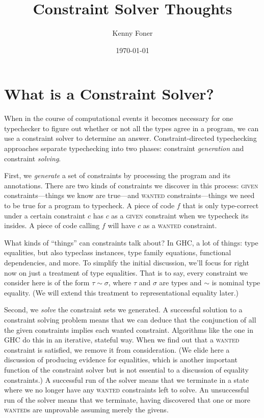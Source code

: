 \documentclass[10pt, letterpaper, oneside]{article}
\title{Constraint Solver Thoughts}
\author{Kenny Foner}
\date{\today}
\begin{document}
\maketitle

\section{What is a Constraint Solver?}

When in the course of computational events it becomes necessary for one typechecker to figure out whether or not all the types agree in a program, we can use a constraint solver to determine an answer. Constraint-directed typechecking approaches separate typechecking into two phases: constraint \emph{generation} and constraint \emph{solving}.

First, we \emph{generate} a set of constraints by processing the program and its annotations. There are two kinds of constraints we discover in this process: \textsc{given} constraints---things we know are true---and \textsc{wanted} constraints---things we need to be true for a program to typecheck. A piece of code \(f\) that is only type-correct under a certain constraint \(c\) has \(c\) as a \textsc{given} constraint when we typecheck its insides. A piece of code calling \(f\) will have \(c\) as a \textsc{wanted} constraint.

What kinds of ``things'' can constraints talk about? In GHC, a lot of things: type equalities, but also typeclass instances, type family equations, functional dependencies, and more. To simplify the initial discussion, we'll focus for right now on just a treatment of type equalities. That is to say, every constraint we consider here is of the form \(\tau \sim \sigma\), where \(\tau\) and \(\sigma\) are types and \(\sim\) is nominal type equality. (We will extend this treatment to representational equality later.)

Second, we \emph{solve} the constraint sets we generated. A successful solution to a constraint solving problem means that we can deduce that the conjunction of all the given constraints implies each wanted constraint. Algorithms like the one in GHC do this in an iterative, stateful way. When we find out that a \textsc{wanted} constraint is satisfied, we remove it from consideration. (We elide here a discussion of producing evidence for equalities, which is another important function of the constraint solver but is not essential to a discussion of equality constraints.) A successful run of the solver means that we terminate in a state where we no longer have any \textsc{wanted} constraints left to solve. An unsuccessful run of the solver means that we terminate, having discovered that one or more {\textsc{wanted}}s are unprovable assuming merely the {\sc given}s.\\
\end{document}
